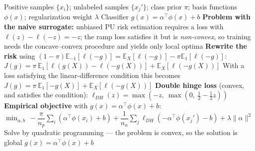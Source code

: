 \documentclass{article}
\begin{document}
\begin{algorithm}[!h]
\renewcommand{\algorithmicrequire}{\textbf{Input:}}
\renewcommand{\algorithmicensure}{\textbf{Output:}}
	\caption{C-DH (convex PU formulation with the double hinge loss)}
	\begin{algorithmic}[1]
	    \REQUIRE
	    Positive samples $\{x_{i}\}$; unlabeled samples $\{x_{j}'\}$;
	    class prior $\pi$; basis functions $\phi(x)$; regularization weight $\lambda$
	    \ENSURE
	    Classifier $g(x)=\alpha^{\top}\phi(x)+b$
	    \STATE \textbf{Problem with the naive surrogate:} unbiased PU risk estimation requires a
	    loss with $\ell(z)-\ell(-z)=-z$; the ramp loss satisfies it but is \emph{non-convex},
	    so training needs the concave--convex procedure and yields only local optima %
	    \STATE \textbf{Rewrite the risk} using
	    $(1-\pi)\mathbb{E}_{-1}[\ell(-g)]=\mathbb{E}_{X}[\ell(-g)]-\pi\mathbb{E}_{1}[\ell(-g)]$:
	    \STATE \quad $J(g)=\pi\,\mathbb{E}_{1}\!\left[\ell(g(X))-\ell(-g(X))\right]
	    +\mathbb{E}_{X}\!\left[\ell(-g(X))\right]$ %
	    \STATE \quad With a loss satisfying the linear-difference condition this becomes
	    $J(g)=\pi\,\mathbb{E}_{1}[-g(X)]+\mathbb{E}_{X}[\ell(-g(X))]$
	    \STATE \textbf{Double hinge loss} (convex, and satisfies the condition):
	    \STATE \quad $\ell_{DH}(z)=\max\!\left(-z,\ \max\!\left(0,\ \tfrac{1}{2}-\tfrac{1}{2}z\right)\right)$ %
	    \STATE \textbf{Empirical objective} with $g(x)=\alpha^{\top}\phi(x)+b$:
	    \STATE \quad $\min_{\alpha,b}\ -\dfrac{\pi}{n_{p}}\sum_{i}\left(\alpha^{\top}\phi(x_{i})+b\right)
	    +\dfrac{1}{n_{u}}\sum_{j}\ell_{DH}\!\left(-\alpha^{\top}\phi(x_{j}')-b\right)
	    +\lambda\|\alpha\|^{2}$
	    \STATE Solve by quadratic programming --- the problem is convex, so the solution is global %
		\RETURN $g(x)=\alpha^{\top}\phi(x)+b$
	\end{algorithmic}
\end{algorithm}
\end{document}
